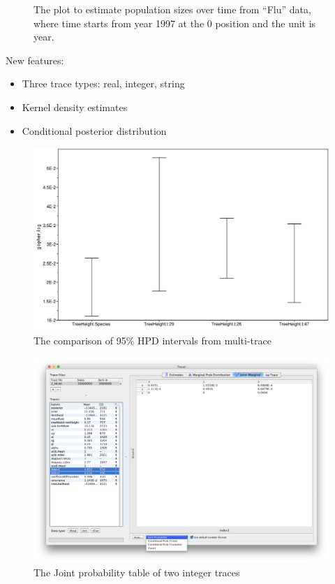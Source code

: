\documentclass{bioinfo}
\begin{document}
\begin{figure}[ht]
\caption{The plot to estimate population sizes over time from ``Flu'' data, where time starts from year 1997 at the 0 position and the unit is year.}
\label{fig:flu}
\end{figure}



New features:
\begin{itemize}
\item Three trace types: real, integer, string
\item Kernel density estimates
\item Conditional posterior distribution
\end{itemize}






\begin{figure}[H]
\includegraphics[width=.5\textwidth]{./figures/comp-95HPD.pdf}  
\caption{The comparison of  95\% HPD intervals from multi-trace}
\label{fig:comp95HPD}
\end{figure}



\begin{figure}[H]
\includegraphics[width=.5\textwidth]{./figures/jointPrInt.png}  
\caption{The Joint probability table of two integer traces}
\label{fig:int:jointpr}
\end{figure}
\end{document}
